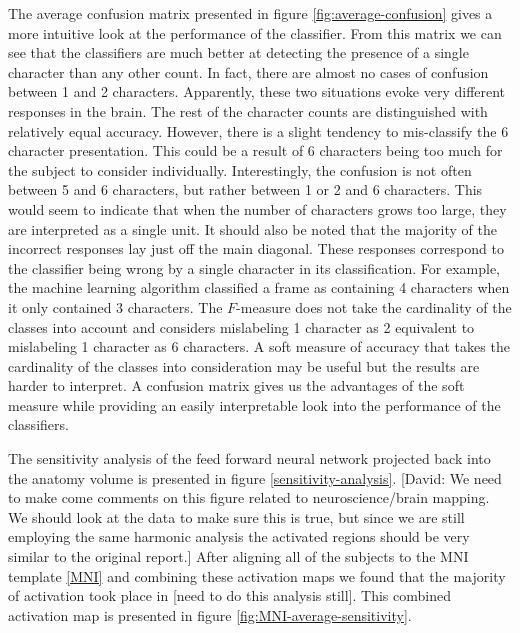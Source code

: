 \documentclass[preprint,authoryear,12pt]{elsarticle}
\begin{document}
The average confusion matrix presented in figure \ref{fig:average-confusion} gives a more intuitive look at the performance of the classifier.
From this matrix we can see that the classifiers are much better at detecting the presence of a single character than any other count.
In fact, there are almost no cases of confusion between 1 and 2 characters.
Apparently, these two situations evoke very different responses in the brain.
The rest of the character counts are distinguished with relatively equal accuracy.
However, there is a slight tendency to mis-classify the 6 character presentation.
This could be a result of 6 characters being too much for the subject to consider individually.
Interestingly, the confusion is not often between 5 and 6 characters, but rather between 1 or 2 and 6 characters.
This would seem to indicate that when the number of characters grows too large, they are interpreted as a single unit.
It should also be noted that the majority of the incorrect responses lay just off the main diagonal.
These responses correspond to the classifier being wrong by a single character in its classification.
For example, the machine learning algorithm classified a frame as containing 4 characters when it only contained 3 characters.
The $F$-measure does not take the cardinality of the classes into account and considers mislabeling 1 character as 2 equivalent to mislabeling 1 character as 6 characters.
A soft measure of accuracy that takes the cardinality of the classes into consideration may be useful but the results are harder to interpret.
A confusion matrix gives us the advantages of the soft measure while providing an easily interpretable look into the performance of the classifiers.

The sensitivity analysis of the feed forward neural network projected back into the anatomy volume is presented in figure \ref{sensitivity-analysis}.
[David: We need to make come comments on this figure related to neuroscience/brain mapping. We should look at the data to make sure this is true, but since we are still employing the same harmonic analysis the activated regions should be very similar to the original report.]
After aligning all of the subjects to the MNI template \ref{MNI} and combining these activation maps we found that the majority of activation took place in [need to do this analysis still].
This combined activation map is presented in figure \ref{fig:MNI-average-sensitivity}.
\end{document}
